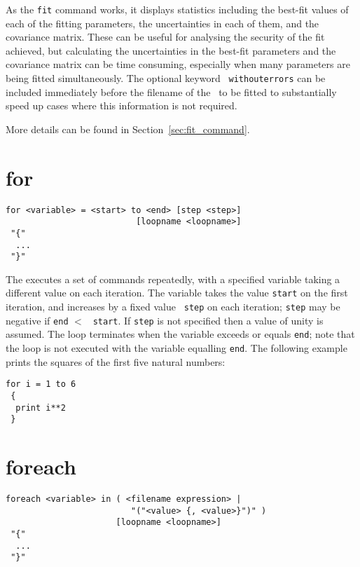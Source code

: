 As the {\tt fit} command works, it displays statistics including the best-fit
values of each of the fitting parameters, the uncertainties in each of them,
and the covariance matrix. These can be useful for analysing the security of
the fit achieved, but calculating the uncertainties in the best-fit parameters
and the covariance matrix can be time consuming, especially when many
parameters are being fitted simultaneously. The optional keyword {\tt
withouterrors} can be included immediately before the filename of the
\datafile\ to be fitted to substantially speed up cases where this information
is not required.

More details can be found in Section~\ref{sec:fit_command}.


\section{for}

\begin{verbatim}
for <variable> = <start> to <end> [step <step>]
                          [loopname <loopname>]
 "{"
  ...
 "}"
\end{verbatim}

The  executes a set of commands repeatedly, with a specified
variable taking a different value on each iteration. The variable takes the
value {\tt start} on the first iteration, and increases by a fixed value {\tt
step} on each iteration; {\tt step} may be negative if {\tt end} $<$ {\tt
start}. If {\tt step} is not specified then a value of unity is assumed. The
loop terminates when the variable exceeds or equals {\tt end}; note that the
loop is not executed with the variable equalling {\tt end}.  The following
example prints the squares of the first five natural numbers:

\begin{verbatim}
for i = 1 to 6
 {
  print i**2
 }
\end{verbatim}


\section{foreach}

\begin{verbatim}
foreach <variable> in ( <filename expression> |
                         "("<value> {, <value>}")" )
                      [loopname <loopname>]
 "{"
  ...
 "}"
\end{verbatim}

